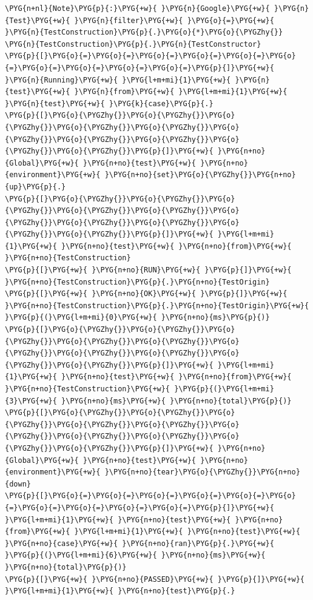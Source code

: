 \begin{codeblockbg}
\begin{Verbatim}[commandchars=\\\{\},breaklines=true,breakanywhere=true,fontsize=\codefont,xleftmargin=17bp]
\PYG{n+nl}{Note}\PYG{p}{:}\PYG{+w}{ }\PYG{n}{Google}\PYG{+w}{ }\PYG{n}{Test}\PYG{+w}{ }\PYG{n}{filter}\PYG{+w}{ }\PYG{o}{=}\PYG{+w}{ }\PYG{n}{TestConstruction}\PYG{p}{.}\PYG{o}{*}\PYG{o}{\PYGZhy{}}
\PYG{n}{TestConstruction}\PYG{p}{.}\PYG{n}{TestConstructor}
\PYG{p}{[}\PYG{o}{=}\PYG{o}{=}\PYG{o}{=}\PYG{o}{=}\PYG{o}{=}\PYG{o}{=}\PYG{o}{=}\PYG{o}{=}\PYG{o}{=}\PYG{o}{=}\PYG{p}{]}\PYG{+w}{ }\PYG{n}{Running}\PYG{+w}{ }\PYG{l+m+mi}{1}\PYG{+w}{ }\PYG{n}{test}\PYG{+w}{ }\PYG{n}{from}\PYG{+w}{ }\PYG{l+m+mi}{1}\PYG{+w}{ }\PYG{n}{test}\PYG{+w}{ }\PYG{k}{case}\PYG{p}{.}
\PYG{p}{[}\PYG{o}{\PYGZhy{}}\PYG{o}{\PYGZhy{}}\PYG{o}{\PYGZhy{}}\PYG{o}{\PYGZhy{}}\PYG{o}{\PYGZhy{}}\PYG{o}{\PYGZhy{}}\PYG{o}{\PYGZhy{}}\PYG{o}{\PYGZhy{}}\PYG{o}{\PYGZhy{}}\PYG{o}{\PYGZhy{}}\PYG{p}{]}\PYG{+w}{ }\PYG{n+no}{Global}\PYG{+w}{ }\PYG{n+no}{test}\PYG{+w}{ }\PYG{n+no}{environment}\PYG{+w}{ }\PYG{n+no}{set}\PYG{o}{\PYGZhy{}}\PYG{n+no}{up}\PYG{p}{.}
\PYG{p}{[}\PYG{o}{\PYGZhy{}}\PYG{o}{\PYGZhy{}}\PYG{o}{\PYGZhy{}}\PYG{o}{\PYGZhy{}}\PYG{o}{\PYGZhy{}}\PYG{o}{\PYGZhy{}}\PYG{o}{\PYGZhy{}}\PYG{o}{\PYGZhy{}}\PYG{o}{\PYGZhy{}}\PYG{o}{\PYGZhy{}}\PYG{p}{]}\PYG{+w}{ }\PYG{l+m+mi}{1}\PYG{+w}{ }\PYG{n+no}{test}\PYG{+w}{ }\PYG{n+no}{from}\PYG{+w}{ }\PYG{n+no}{TestConstruction}
\PYG{p}{[}\PYG{+w}{ }\PYG{n+no}{RUN}\PYG{+w}{ }\PYG{p}{]}\PYG{+w}{ }\PYG{n+no}{TestConstruction}\PYG{p}{.}\PYG{n+no}{TestOrigin}
\PYG{p}{[}\PYG{+w}{ }\PYG{n+no}{OK}\PYG{+w}{ }\PYG{p}{]}\PYG{+w}{ }\PYG{n+no}{TestConstruction}\PYG{p}{.}\PYG{n+no}{TestOrigin}\PYG{+w}{ }\PYG{p}{(}\PYG{l+m+mi}{0}\PYG{+w}{ }\PYG{n+no}{ms}\PYG{p}{)}
\PYG{p}{[}\PYG{o}{\PYGZhy{}}\PYG{o}{\PYGZhy{}}\PYG{o}{\PYGZhy{}}\PYG{o}{\PYGZhy{}}\PYG{o}{\PYGZhy{}}\PYG{o}{\PYGZhy{}}\PYG{o}{\PYGZhy{}}\PYG{o}{\PYGZhy{}}\PYG{o}{\PYGZhy{}}\PYG{o}{\PYGZhy{}}\PYG{p}{]}\PYG{+w}{ }\PYG{l+m+mi}{1}\PYG{+w}{ }\PYG{n+no}{test}\PYG{+w}{ }\PYG{n+no}{from}\PYG{+w}{ }\PYG{n+no}{TestConstruction}\PYG{+w}{ }\PYG{p}{(}\PYG{l+m+mi}{3}\PYG{+w}{ }\PYG{n+no}{ms}\PYG{+w}{ }\PYG{n+no}{total}\PYG{p}{)}
\PYG{p}{[}\PYG{o}{\PYGZhy{}}\PYG{o}{\PYGZhy{}}\PYG{o}{\PYGZhy{}}\PYG{o}{\PYGZhy{}}\PYG{o}{\PYGZhy{}}\PYG{o}{\PYGZhy{}}\PYG{o}{\PYGZhy{}}\PYG{o}{\PYGZhy{}}\PYG{o}{\PYGZhy{}}\PYG{o}{\PYGZhy{}}\PYG{p}{]}\PYG{+w}{ }\PYG{n+no}{Global}\PYG{+w}{ }\PYG{n+no}{test}\PYG{+w}{ }\PYG{n+no}{environment}\PYG{+w}{ }\PYG{n+no}{tear}\PYG{o}{\PYGZhy{}}\PYG{n+no}{down}
\PYG{p}{[}\PYG{o}{=}\PYG{o}{=}\PYG{o}{=}\PYG{o}{=}\PYG{o}{=}\PYG{o}{=}\PYG{o}{=}\PYG{o}{=}\PYG{o}{=}\PYG{o}{=}\PYG{p}{]}\PYG{+w}{ }\PYG{l+m+mi}{1}\PYG{+w}{ }\PYG{n+no}{test}\PYG{+w}{ }\PYG{n+no}{from}\PYG{+w}{ }\PYG{l+m+mi}{1}\PYG{+w}{ }\PYG{n+no}{test}\PYG{+w}{ }\PYG{n+no}{case}\PYG{+w}{ }\PYG{n+no}{ran}\PYG{p}{.}\PYG{+w}{ }\PYG{p}{(}\PYG{l+m+mi}{6}\PYG{+w}{ }\PYG{n+no}{ms}\PYG{+w}{ }\PYG{n+no}{total}\PYG{p}{)}
\PYG{p}{[}\PYG{+w}{ }\PYG{n+no}{PASSED}\PYG{+w}{ }\PYG{p}{]}\PYG{+w}{ }\PYG{l+m+mi}{1}\PYG{+w}{ }\PYG{n+no}{test}\PYG{p}{.}
\end{Verbatim}
\end{codeblockbg}


